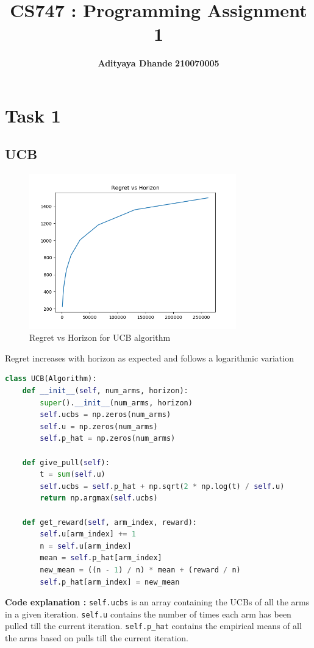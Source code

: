 \documentclass[11pt]{article}
\title{\textbf{CS747 : Programming Assignment 1}}
\author{\textbf{Adityaya Dhande}   \hspace{8mm} \textbf{210070005}}
\begin{document}
\maketitle
\section*{Task 1}

\subsection*{UCB}

\begin{figure}[H]
    \begin{center}
        \includegraphics[width=0.8\textwidth]{../images/task1-UCB-20230907-175734.png}
        
        \caption{Regret vs Horizon for UCB algorithm}
    \end{center}
 \end{figure}
 Regret increases with horizon as expected and follows a logarithmic variation
 \begin{lstlisting}[language=Python]      
    class UCB(Algorithm):
    def __init__(self, num_arms, horizon):
        super().__init__(num_arms, horizon)
        self.ucbs = np.zeros(num_arms)
        self.u = np.zeros(num_arms)
        self.p_hat = np.zeros(num_arms)
    
    def give_pull(self):
        t = sum(self.u)
        self.ucbs = self.p_hat + np.sqrt(2 * np.log(t) / self.u)
        return np.argmax(self.ucbs)
    
    def get_reward(self, arm_index, reward):
        self.u[arm_index] += 1
        n = self.u[arm_index]
        mean = self.p_hat[arm_index]
        new_mean = ((n - 1) / n) * mean + (reward / n)
        self.p_hat[arm_index] = new_mean\end{lstlisting}
    \textbf{Code explanation :} \texttt{self.ucbs} is an array containing
    the UCBs of all the arms in a given iteration. \texttt{self.u} contains
    the number of times each arm has been pulled till the current iteration. 
    \texttt{self.p\_hat} contains the empirical means of all the arms
    based on pulls till the current iteration. 
    
\end{document}
